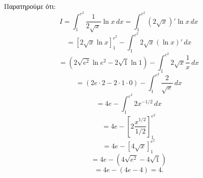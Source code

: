 \begin{alist}
    \item Παρατηρούμε ότι:
    \[ I = \int_1^{e^2} \frac{1}{2\sqrt{x}} \ln x \, dx = \int_1^{e^2} (2\sqrt{x})' \ln x \, dx \]
    \[ = \left[ 2\sqrt{x} \ln x \right]_1^{e^2} - \int_1^{e^2} 2\sqrt{x} (\ln x)' \, dx \]
    \[ = (2\sqrt{e^2} \ln e^2 - 2\sqrt{1} \ln 1) - \int_1^{e^2} 2\sqrt{x} \frac{1}{x} \, dx \]
    \[ = (2e \cdot 2 - 2 \cdot 1 \cdot 0) - \int_1^{e^2} \frac{2}{\sqrt{x}} \, dx \]
    \[ = 4e - \int_1^{e^2} 2x^{-1/2} \, dx \]
    \[ = 4e - \left[ 2 \frac{x^{1/2}}{1/2} \right]_1^{e^2} \]
    \[ = 4e - \left[ 4\sqrt{x} \right]_1^{e^2} \]
    \[ = 4e - (4\sqrt{e^2} - 4\sqrt{1}) \]
    \[ = 4e - (4e - 4) = 4. \]
\end{alist}